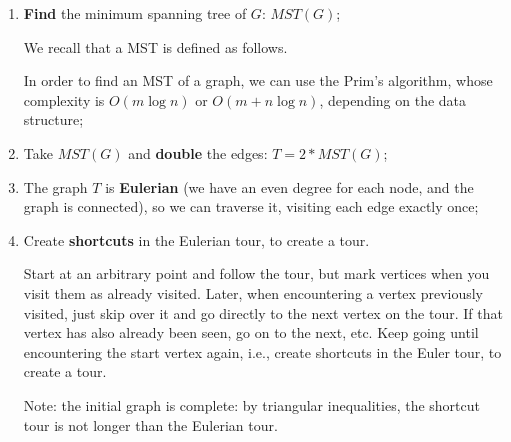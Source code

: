 \begin{enumerate}
    \item \textbf{Find} the minimum spanning tree of $G$: $MST(G)$; 

    
    We recall that a MST is defined as follows.

    
    
    In order to find an MST of a graph, we can use the Prim's algorithm, whose complexity is $O(m \log n)$ or $O(m + n \log n)$, depending on the data structure;
    
    \item Take $MST(G)$ and \textbf{double} the edges: $T=2*MST(G)$;

    
    \item The graph $T$ is \textbf{Eulerian} (we have an even degree for each node, and the graph is connected), so we can traverse it, visiting each edge exactly once;
    \item Create \textbf{shortcuts} in the Eulerian tour, to create a tour.

    Start at an arbitrary point and follow the tour, but mark vertices when you visit them as already visited. Later, when encountering a vertex previously visited, just skip over it and go directly to the next vertex on the tour. If that vertex has also already been seen, go on to the next, etc. Keep going until encountering the start vertex again, i.e., create shortcuts in the Euler tour, to create a tour.


    Note: the initial graph is complete: by triangular inequalities, the shortcut tour is not longer than the Eulerian tour.
    
\end{enumerate}


